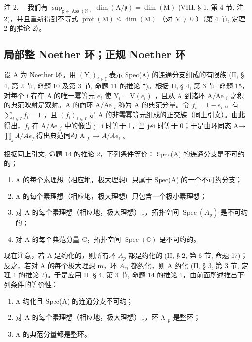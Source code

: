 注 2.--- 我们有 \(\sup_{\mathfrak{p}\in\operatorname{Ass}(\mathbb{M})}\dim(\mathrm{A}/\mathfrak{p})=\dim(\mathrm{M})\) (VIII, § 1, 第 4 节, 注 2)，并且重新得到不等式 \(\operatorname{prof}(\mathrm{M})\leqslant\dim(\mathrm{M})\) （对 \(\mathrm{M}\neq0\) ）（第 4 节, 定理 2 的推论 2）。

\subsection{局部整 Noether 环；正规 Noether 环}

设 A 为 Noether 环。用 \((\mathrm{Y}_{i})_{i\in\mathrm{I}}\) 表示 Spec(A) 的连通分支组成的有限族 (II, § 4, 第 2 节, 命题 10 及第 3 节, 命题 11 的推论 7)。根据 II, § 4, 第 3 节, 命题 15，对每个 i 存在 A 的唯一幂等元 \(e_{i}\) 使 \(\mathrm{Y}_{i}=\mathrm{V}(e_{i})\) ，且从 A 到诸环 A/Ae \(_{i}\) 之积的典范映射是双射。A 的商环 A/Ae \(_{i}\) 称为 A 的典范分量。令 \(f_{i}=1-e_{i}\) 。有 \(\sum_{i\in I}f_{i}=1\) ，且 \((f_{i})_{i\in I}\) 是 A 的非零幂等元组成的正交族（同上引文）。由此得出，\(f_{i}\) 在 A/Ae \(_{j}\) 中的像当 j=i 时等于 1，当 j≠i 时等于 0；于是由环同态 A→ \(\prod_{j}A/Ae_{j}\) 得出典范同构 A \(_{f_{i}}\rightarrow A/Ae_{i}\) 。

根据同上引文, 命题 14 的推论 2，下列条件等价： Spec(A) 的连通分支是不可约的；

\begin{enumerate}
\def\labelenumi{(\roman{enumi})}
\setcounter{enumi}{1}
\item
  A 的每个素理想（相应地，极大理想）只属于 Spec(A) 的一个不可约分支；
\item
  A 的每个素理想（相应地，极大理想）只包含一个极小素理想；
\item
  对 A 的每个素理想（相应地，极大理想）p，拓扑空间 \(\operatorname{Spec}(A_{\mathfrak{p}})\) 是不可约的；
\item
  对 A 的每个典范分量 C，拓扑空间 \(\operatorname{Spec}(\mathbb{C})\) 是不可约的。
\end{enumerate}

现在注意，若 A 是约化的，则所有环 \(A_{p}\) 都是约化的 (II, § 2, 第 6 节, 命题 17)；反之，若对 A 的每个极大理想 m，环 \(A_{m}\) 都约化，则 A 约化 (II, § 3, 第 3 节, 定理 1 的推论 2)。于是应用 II, § 4, 第 3 节, 命题 14 的推论 1，由前面所述推出下列条件的等价性：

\begin{enumerate}
\def\labelenumi{(\roman{enumi})}
\item
  A 约化且 Spec(A) 的连通分支不可约；
\item
  对 A 的每个素理想（相应地，极大理想）p，环 A \(_{p}\) 是整环；
\item
  A 的典范分量都是整环。
\end{enumerate}

